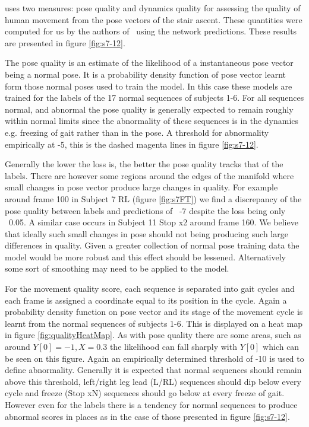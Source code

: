 \documentclass[11pt]{article} %
\begin{document}
\cite{Paiement} uses two measures: pose quality and dynamics quality for assessing the quality of human movement from the pose vectors of the stair ascent. These quantities were computed for us by the authors of~\cite{Paiement} using the network predictions. These results are presented in figure \ref{fig:s7-12}. 

The pose quality is an estimate of the likelihood of a instantaneous pose vector being a normal pose. It is a probability density function of pose vector learnt form those normal poses used to train the model. In this case these models are trained for the labels of the 17 normal sequences of subjects 1-6. For all sequences normal, and abnormal the pose quality is generally expected to remain roughly within normal limits since the abnormality of these sequences is in the dynamics e.g. freezing of gait rather than in the pose. A threshold for abnormality empirically at -5, this is the dashed magenta lines in figure \ref{fig:s7-12}.

Generally the lower the loss is, the better the pose quality tracks that of the labels. There are however some regions around the edges of the manifold where small changes in pose vector produce large changes in quality. For example around frame 100 in Subject 7 RL (figure \ref{fig:s7FT}) we find a discrepancy of the pose quality between labels and predictions of ~-7 despite the loss being only ~0.05. A similar case occurs in Subject 11 Stop x2 around frame 160. We believe that ideally such small changes in pose should not being producing such large differences in quality. Given a greater collection of normal pose training data the model would be more robust and this effect should be lessened. Alternatively some sort of smoothing may need to be applied to the model.

For the movement quality score, each sequence is separated into gait cycles and each frame is assigned a coordinate equal to its position in the cycle. Again a probability density function on pose vector and its stage of the movement cycle is learnt from the normal sequences of subjects 1-6. This is displayed on a heat map in figure \ref{fig:qualityHeatMap}. As with pose quality there are some areas, such as around $Y[0]=-1,X=0.3$ the likelihood can fall sharply with $Y[0]$ which can be seen on this figure. Again an empirically determined threshold of -10 is used to define abnormality. Generally it is expected that normal sequences should remain above this threshold, left/right leg lead (L/RL) sequences should dip below every cycle and freeze (Stop xN) sequences should go below at every freeze of gait. However even for the labels there is a tendency for normal sequences to produce abnormal scores in places as in the case of those presented in figure \ref{fig:s7-12}. 
\end{document}
